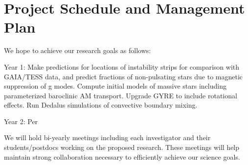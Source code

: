 \section{Project Schedule and Management Plan}

We hope to achieve our research goals as follows:

Year 1: Make predictions for locations of instability strips for comparison with GAIA/TESS data, and predict fractions of non-pulsating stars due to magnetic suppression of g modes. Compute initial models of massive stars including parameterized baroclinic AM transport. Upgrade GYRE to include rotational effects. Run Dedalus simulations of convective boundary mixing.

Year 2: Per

We will  hold bi-yearly meetings including each investigator and their students/postdocs working on the proposed research. These meetings will help maintain strong collaboration necessary to efficiently achieve our science goals.

